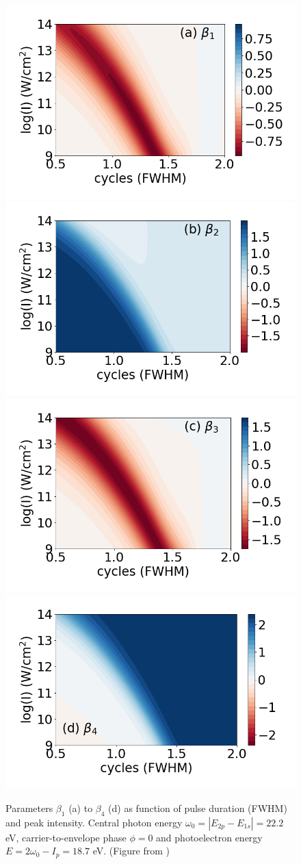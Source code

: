 \begin{figure}[!ht]
\centering
\includegraphics[width=0.49\linewidth]{figs/Photo_ionization/short_pulse/beta_1_heat.png}
\includegraphics[width=0.49\linewidth]{figs/Photo_ionization/short_pulse/beta_2_heat.png}\\
\includegraphics[width=0.49\linewidth]{figs/Photo_ionization/short_pulse/beta_3_heat.png}
\includegraphics[width=0.49\linewidth]{figs/Photo_ionization/short_pulse/beta_4_heat.png}
\caption{
Parameters $\beta_1$ (a) to $\beta_4$ (d) as function of pulse duration (FWHM) and peak intensity. Central photon energy $\omega_0 = |E_{2p} - E_{1s}| = 22.2$ eV, carrier-to-envelope phase $\phi=0$ and photoelectron energy $E = 2\omega_0 - I_p = 18.7$ eV. (Figure from \cite{venzke2020_ionization})
} 
  \label{fig:beta}
\end{figure}

